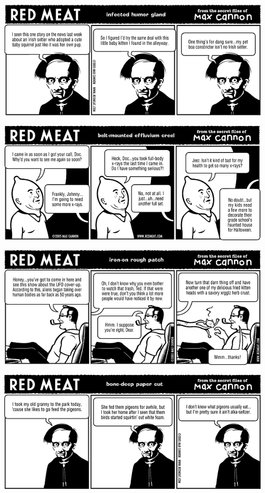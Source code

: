 \documentclass[a4paper,twoside,11pt]{article}
\begin{document}
\includegraphics[width=\textwidth]{redmeat_2005-09-27.png}



\includegraphics[width=\textwidth]{redmeat_2005-10-04.png}



\includegraphics[width=\textwidth]{redmeat_2005-10-11.png}



\includegraphics[width=\textwidth]{redmeat_2005-10-18.png}
\end{document}
